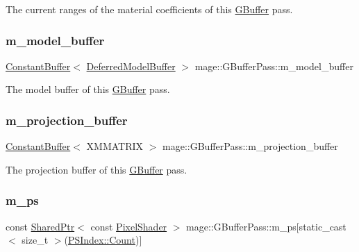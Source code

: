 The current ranges of the material coefficients of this \hyperlink{structmage_1_1_g_buffer}{G\+Buffer} pass. \hypertarget{classmage_1_1_g_buffer_pass_a62c6dc82f6571657d2907ab83819b6dd}{}\label{classmage_1_1_g_buffer_pass_a62c6dc82f6571657d2907ab83819b6dd} 
\subsubsection{\texorpdfstring{m\+\_\+model\+\_\+buffer}{m\_model\_buffer}}
{\footnotesize\ttfamily \hyperlink{structmage_1_1_constant_buffer}{Constant\+Buffer}$<$ \hyperlink{structmage_1_1_deferred_model_buffer}{Deferred\+Model\+Buffer} $>$ mage\+::\+G\+Buffer\+Pass\+::m\+\_\+model\+\_\+buffer\hspace{0.3cm}{\ttfamily [private]}}

The model buffer of this \hyperlink{structmage_1_1_g_buffer}{G\+Buffer} pass. \hypertarget{classmage_1_1_g_buffer_pass_a1c51afa751e58dedaad5effabc26f85d}{}\label{classmage_1_1_g_buffer_pass_a1c51afa751e58dedaad5effabc26f85d} 
\subsubsection{\texorpdfstring{m\+\_\+projection\+\_\+buffer}{m\_projection\_buffer}}
{\footnotesize\ttfamily \hyperlink{structmage_1_1_constant_buffer}{Constant\+Buffer}$<$ X\+M\+M\+A\+T\+R\+IX $>$ mage\+::\+G\+Buffer\+Pass\+::m\+\_\+projection\+\_\+buffer\hspace{0.3cm}{\ttfamily [private]}}

The projection buffer of this \hyperlink{structmage_1_1_g_buffer}{G\+Buffer} pass. \hypertarget{classmage_1_1_g_buffer_pass_ae607b9a6dab89d45865dc0ede3212fcd}{}\label{classmage_1_1_g_buffer_pass_ae607b9a6dab89d45865dc0ede3212fcd} 
\subsubsection{\texorpdfstring{m\+\_\+ps}{m\_ps}}
{\footnotesize\ttfamily const \hyperlink{namespacemage_a1e01ae66713838a7a67d30e44c67703e}{Shared\+Ptr}$<$ const \hyperlink{namespacemage_a27ecaf266420ee7a494d64edc0757129}{Pixel\+Shader} $>$ mage\+::\+G\+Buffer\+Pass\+::m\+\_\+ps\mbox{[}static\+\_\+cast$<$ size\+\_\+t $>$(\hyperlink{classmage_1_1_g_buffer_pass_a1dbae3cb33d9c90ce7eb8c119d576379ae93f994f01c537c4e2f7d8528c3eb5e9}{P\+S\+Index\+::\+Count})\mbox{]}\hspace{0.3cm}{\ttfamily [private]}}


